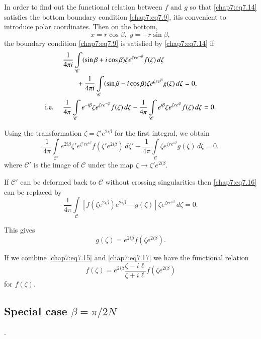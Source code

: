In order to find out the functional relation between $f$ and $g$ so that \eqref{chap7:eq7.14} satisfies the bottom boundary condition \eqref{chap7:eq7.9}, it\pageoriginale is convenient to introduce polar coordinates. Then on the bottom,
$$
x=r\cos\beta,\; y= -r\sin\beta,
$$
the boundary condition \eqref{chap7:eq7.9} is satisfied by \eqref{chap7:eq7.14} if 
\begin{align*}
&\frac{1}{4\pi i}\int\limits_{\mathscr{C}}(\sin\beta +i\cos\beta)\zeta e^{\zeta re^{-i\beta}}f(\zeta)\,d\zeta\\
&\qquad +\frac{1}{4\pi i}\int\limits_{\mathscr{C}}(\sin\beta-i\cos\beta)\zeta e^{\zeta re^{i\beta}}g(\zeta)\,d\zeta =0,\\
\text{{i.e.}\kern.3em}\quad& \frac{1}{4\pi}\int\limits_{\mathscr{C}}e^{-i\beta}\zeta e^{\zeta re^{-i\beta}}f(\zeta)\,d\zeta -\frac{1}{4\pi}\int\limits_{\mathscr{C}}e^{i\beta} \zeta e^{\zeta re^{i\beta}}f(\zeta)\,d\zeta =0.
\end{align*}

Using the transformation $\zeta =\zeta' e^{2i\beta}$ for the first integral, we obtain
\begin{equation}
\frac{1}{4\pi}\int\limits_{\mathscr{C'}}e^{2i\beta}\zeta'e^{\zeta're^{i\beta}}f\left(\zeta' e^{2i\beta}\right)\,d\zeta'-\frac{1}{4\pi}\int\limits_{\mathscr{C}}\zeta e^{\zeta re^{i\beta}}g(\zeta)\,d\zeta =0.\tag{7.16}\label{chap7:eq7.16}
\end{equation}
where $\mathscr{C'}$ is the image of $\mathscr{C}$ under the map $\zeta\to \zeta'e^{2i\beta}$.

If $\mathscr{C'}$ can be deformed back to $\mathscr{C}$ without crossing singularities then \eqref{chap7:eq7.16} can be replaced by 
$$
\frac{1}{4\pi}\int\limits_{\mathscr{C}} \left[ f\left(\zeta e^{2i\beta}\right) e^{2i\beta} - g(\zeta)\right]\zeta e^{\zeta re^{i\beta}}\, d\zeta =0.
$$

This gives
\begin{equation}
g(\zeta) = e^{2i\beta} f \left(\zeta e^{2i\beta} \right).\tag{7.17}\label{chap7:eq7.17}
\end{equation}

If we combine \eqref{chap7:eq7.15} and \eqref{chap7:eq7.17} we have the functional relation
\begin{equation}
f(\zeta)=e^{2i\beta}\frac{\zeta-i\ell}{\zeta+i\ell}f\left(\zeta e^{2i\beta}\right)\tag{7.18}\label{chap7:eq7.18}
\end{equation}
for $f(\zeta)$. 

\subsection*{\bf Special case $\beta =\pi/2N$}.\pageoriginale

